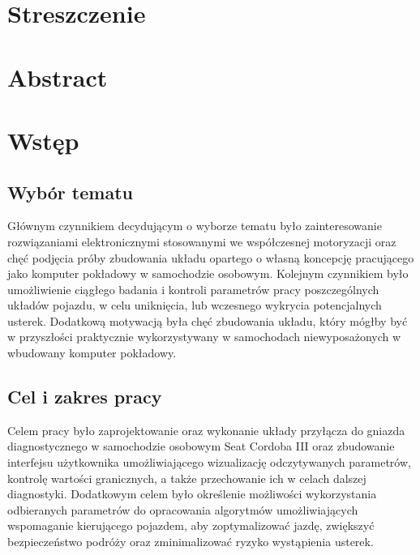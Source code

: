 \documentclass[12pt]{article} %
\numberwithin{equation}{subsection}
\numberwithin{figure}{section}
\numberwithin{table}{section}
\begin{document}
\newpage
\thispagestyle{empty}
\section*{Streszczenie}
\vspace{0.5cm}
\hspace{0.5cm}
\newpage

\section*{Abstract}
\thispagestyle{empty}
\vspace{0.5cm}
\hspace{0.5cm}

\newpage

\section{Wstęp}

	\subsection{Wybór tematu}
		\hspace{0.5cm}Głównym czynnikiem decydującym o wyborze tematu było zainteresowanie rozwiązaniami elektronicznymi stosowanymi we współczesnej motoryzacji oraz chęć podjęcia próby zbudowania układu opartego o własną koncepcję pracującego jako komputer pokładowy w samochodzie osobowym. Kolejnym czynnikiem było umożliwienie ciągłego badania i kontroli parametrów pracy poszczególnych układów pojazdu, w celu uniknięcia, lub wczesnego wykrycia potencjalnych usterek. Dodatkową motywacją była chęć zbudowania układu, który mógłby być w przyszłości praktycznie wykorzystywany w samochodach niewyposażonych w wbudowany komputer pokładowy. 	
	
	\subsection{Cel i zakres pracy}
		\hspace{0.5cm}Celem pracy było zaprojektowanie oraz wykonanie układy przyłącza do gniazda diagnostycznego w samochodzie osobowym Seat Cordoba III oraz zbudowanie interfejsu użytkownika umożliwiającego wizualizację odczytywanych parametrów, kontrolę wartości granicznych, a także przechowanie ich w celach dalszej diagnostyki. Dodatkowym celem było określenie możliwości wykorzystania odbieranych parametrów do opracowania algorytmów umożliwiających wspomaganie kierującego pojazdem, aby zoptymalizować jazdę, zwiększyć bezpieczeństwo podróży oraz zminimalizować ryzyko wystąpienia usterek. 
	
\end{document}
